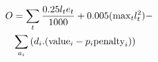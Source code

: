 \documentclass[conference]{IEEEtran}
\begin{document}
%
%
%
%
%
%
%





\begin{equation}
\begin{aligned}
    O &  = \sum_{t}{\frac{0.25 l_t e_t}{1000}} + 0.005 ({\rm max}_t l_t^2) - \\
    & \sum_{a_i}{(d_i . ({\rm value}_i - p_i {\rm penalty}_i)) }
\end{aligned}
\label{eq1} 
\end{equation}
\end{document}

